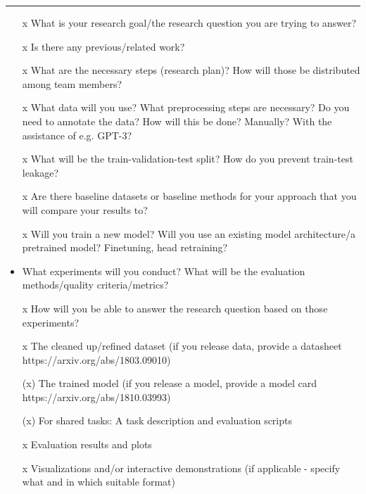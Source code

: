 \documentclass[a4paper,12pt,numbers=enddot]{scrartcl}
\begin{document}
\hrule
\vspace{-2.5em}
\renewcommand{\refname}{}
\nocite{*}


\clearpage

\begin{itemize}
	\setlength\itemsep{-5pt}
	\item[x] What is your research goal/the research question you are trying to answer?
	\item[x] Is there any previous/related work?
	\item[x] What are the necessary steps (research plan)? How will those be distributed among 	team members?
	\item[x] What data will you use? What preprocessing steps are necessary? Do you need to annotate the data? How will this be done? Manually? With the assistance of e.g. GPT-3?
	\item[x] What will be the train-validation-test split? How do you prevent train-test leakage?
	\item[x] Are there baseline datasets or baseline methods for your approach that you will compare your results to?
	\item[x] Will you train a new model? Will you use an existing model architecture/a pretrained model? Finetuning, head retraining?
	\item What experiments will you conduct? What will be the evaluation methods/quality criteria/metrics?
	\item[x] How will you be able to answer the research question based on those experiments?
\end{itemize}

\begin{itemize}
	\setlength\itemsep{-5pt}
	\item[x] The cleaned up/refined dataset (if you release data, provide a datasheet https://arxiv.org/abs/1803.09010)
	\item[(x)] The trained model (if you release a model, provide a model card https://arxiv.org/abs/1810.03993)
	\item[(x)] For shared tasks: A task description and evaluation scripts
	\item[x] Evaluation results and plots
	\item[x] Visualizations and/or interactive demonstrations (if applicable - specify what and in which suitable format)
\end{itemize}
\end{document}
